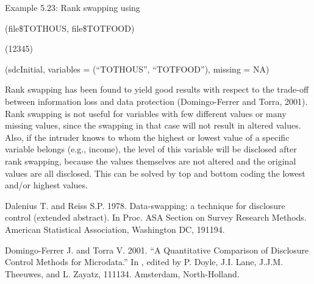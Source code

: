\documentclass[letterpaper,10pt,english]{sphinxmanual}
\begin{document}
Example 5.23: Rank swapping using 

\begin{DUlineblock}{0em}
\item[] 
\item[] (file\$TOTHOUS, file\$TOTFOOD)
\end{DUlineblock}


\begin{DUlineblock}{0em}
\item[] 
\item[] (12345)
\end{DUlineblock}

\begin{DUlineblock}{0em}
\item[] 
\item[] (sdcInitial, variables = (“TOTHOUS”, “TOTFOOD”),
missing = NA)
\end{DUlineblock}

Rank swapping has been found to yield good results with respect to the
trade-off between information loss and data protection (Domingo-Ferrer
and Torra, 2001). Rank swapping is not useful for variables with few
different values or many missing values, since the swapping in that case
will not result in altered values. Also, if the intruder knows to whom
the highest or lowest value of a specific variable belongs (e.g.,
income), the level of this variable will be disclosed after rank
swapping, because the values themselves are not altered and the original
values are all disclosed. This can be solved by top and bottom coding
the lowest and/or highest values.


Dalenius T. and Reiss S.P. 1978. Data-swapping: a technique for
disclosure control (extended abstract). In Proc. ASA Section on Survey
Research Methods. American Statistical Association, Washington DC,
191\textendash{}194.

Domingo-Ferrer J. and Torra V. 2001. “A Quantitative Comparison of
Disclosure Control Methods for Microdata.” In , edited by P. Doyle, J.I. Lane, J.J.M. Theeuwes,
and L. Zayatz, 111\textendash{}134. Amsterdam, North-Holland.
\end{document}
